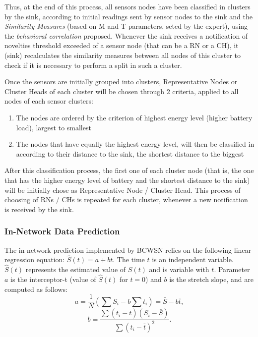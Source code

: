 \documentclass[conference]{IEEEtran}
\begin{document}
Thus, at the end of this process, all sensors nodes have been classified in
clusters by the sink, according to initial readings sent by sensor nodes to the
sink and the \textit{Similarity Measures} (based on M and T parameters, seted by
the expert), using the \textit{behavioral correlation} proposed.
Whenever the sink receives a notification of novelties threshold exceeded of a
sensor node (that can be a RN or a CH), it (sink) recalculates the similarity
measures between all nodes of this cluster to check if it is necessary to
perform a split in such a cluster.

Once the sensors are initially grouped into clusters, Representative Nodes or
Cluster Heads of each cluster will be chosen through 2 criteria, applied to all
nodes of each sensor clusters:
\begin{enumerate}
    \item The nodes are ordered by the criterion of highest energy level (higher
    battery load), largest to smallest
    \item The nodes that have equally the highest energy level, will then be
    classified in according to their distance to the sink, the shortest distance
    to the biggest
 \end{enumerate}


After this classification process, the first one of each cluster node (that is,
the one that has the higher energy level of battery and the shortest distance to
the sink) will be initially chose as Representative Node / Cluster Head. This
process of choosing of RNs / CHs is repeated for each cluster, whenever a new
notification is received by the sink.


\subsubsection{In-Network Data Prediction}
\label{data-predict}


The in-network prediction implemented by BCWSN relies on the
following linear regression equation: $\hat{S}(t) = a + bt$.
The time $t$ is an independent variable. $\hat{S}(t)$ represents the estimated
value of $S(t)$ and is variable with $t$. Parameter $a$ is the interceptor-t
(value of $\hat{S}(t)$ for $t=0$) and $b$ is the stretch slope, and are computed
as follows:
\begin{equation}
	a = \frac{1}{N}\left(\sum S_{i} - b\sum t_{i} \right) = \bar{S} - b\bar{t},
\end{equation}
\vspace*{-.3cm}
\begin{equation}
	b = \frac{\sum \left(t_{i} - \bar{t}\right)\left(S_{i} - \bar{S}\right)}{\sum \left(t_{i} - \bar{t}\right)^{2}}.
\end{equation}
\end{document}
